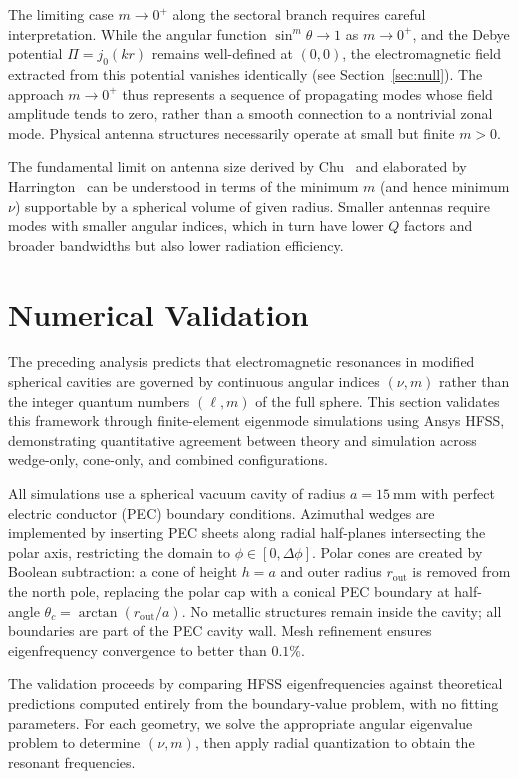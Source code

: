 \documentclass[
  aip,
  amsmath,amssymb,
  preprint
]{revtex4-1}
\begin{document}
The limiting case $m \to 0^+$ along the sectoral branch requires careful 
interpretation. While the angular function $\sin^m\theta \to 1$ as $m \to 0^+$, and the Debye potential $\Pi = j_0(kr)$ remains well-defined at $(0,0)$, the electromagnetic field extracted from this potential vanishes identically (see Section~\ref{sec:null}). The approach $m \to 0^+$ thus represents a sequence of propagating modes whose field amplitude tends to zero, rather than a smooth connection to a nontrivial zonal mode. Physical antenna structures necessarily operate at small but finite $m > 0$.

The fundamental limit on antenna size derived by Chu~\cite{Chu1948} and elaborated by Harrington~\cite{Harrington1960} can be understood in terms of the minimum $m$ (and hence minimum $\nu$) supportable by a spherical volume of given radius. Smaller antennas require modes with smaller angular indices, which in turn have lower $Q$ factors and broader bandwidths but also lower radiation efficiency.

\section{Numerical Validation}
\label{validation}
The preceding analysis predicts that electromagnetic resonances in modified spherical cavities are governed by continuous angular indices $(\nu, m)$ rather than the integer quantum numbers $(\ell, m)$ of the full sphere. This section validates this framework through finite-element eigenmode simulations using Ansys HFSS, demonstrating quantitative agreement between theory and simulation across wedge-only, cone-only, and combined configurations.

All simulations use a spherical vacuum cavity of radius $a = 15~\mathrm{mm}$ with perfect electric conductor (PEC) boundary conditions. Azimuthal wedges are implemented by inserting PEC sheets along radial half-planes intersecting the polar axis, restricting the domain to $\phi \in [0, \Delta\phi]$. Polar cones are created by Boolean subtraction: a cone of height $h = a$ and outer radius $r_{\mathrm{out}}$ is removed from the north pole, replacing the polar cap with a conical PEC boundary at half-angle $\theta_c = \arctan(r_{\mathrm{out}}/a)$. No metallic structures remain inside the cavity; all boundaries are part of the PEC cavity wall. Mesh refinement ensures eigenfrequency convergence to better than $0.1\%$.

The validation proceeds by comparing HFSS eigenfrequencies against theoretical predictions computed entirely from the boundary-value problem, with no fitting parameters. For each geometry, we solve the appropriate angular eigenvalue problem to determine $(\nu, m)$, then apply radial quantization to obtain the resonant frequencies.
\end{document}
